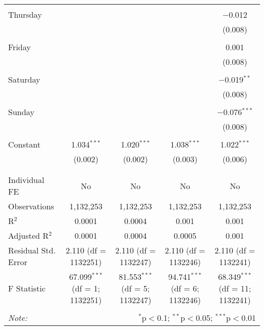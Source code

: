 \documentclass[
]{article}
\begin{document}
\begin{table}[!htbp]
{\begin{tabular}{@{\extracolsep{5pt}}lcccc}
  & & & & \\ 
 Thursday &  &  &  & $-$0.012 \\ 
  &  &  &  & (0.008) \\ 
  & & & & \\ 
 Friday &  &  &  & 0.001 \\ 
  &  &  &  & (0.008) \\ 
  & & & & \\ 
 Saturday &  &  &  & $-$0.019$^{**}$ \\ 
  &  &  &  & (0.008) \\ 
  & & & & \\ 
 Sunday &  &  &  & $-$0.076$^{***}$ \\ 
  &  &  &  & (0.008) \\ 
  & & & & \\ 
 Constant & 1.034$^{***}$ & 1.020$^{***}$ & 1.038$^{***}$ & 1.022$^{***}$ \\ 
  & (0.002) & (0.002) & (0.003) & (0.006) \\ 
  & & & & \\ 
\hline \\[-1.8ex] 
Individual FE & No & No & No & No \\ 
Observations & 1,132,253 & 1,132,253 & 1,132,253 & 1,132,253 \\ 
R$^{2}$ & 0.0001 & 0.0004 & 0.001 & 0.001 \\ 
Adjusted R$^{2}$ & 0.0001 & 0.0004 & 0.0005 & 0.001 \\ 
Residual Std. Error & 2.110 (df = 1132251) & 2.110 (df = 1132247) & 2.110 (df = 1132246) & 2.110 (df = 1132241) \\ 
F Statistic & 67.099$^{***}$ (df = 1; 1132251) & 81.553$^{***}$ (df = 5; 1132247) & 94.741$^{***}$ (df = 6; 1132246) & 68.349$^{***}$ (df = 11; 1132241) \\ 
\hline 
\hline \\[-1.8ex] 
\textit{Note:}  & \multicolumn{4}{r}{$^{*}$p$<$0.1; $^{**}$p$<$0.05; $^{***}$p$<$0.01} \\ 
\end{tabular}
} 
\end{table} 
\newpage
\end{document}
